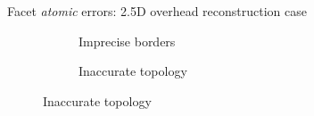 \documentclass[10pt, export]{beamer}
\begin{document}
\begin{frame}{Facet \textit{atomic} errors: 2.5D overhead reconstruction case}
\begin{figure}
\begin{center}
\begin{subfigure}{.33\textwidth}
                        \caption{\label{fig::fac_footprint} Imprecise borders}
                    \end{subfigure}
                    \begin{subfigure}{.33\textwidth}
                        \caption{\label{fig::fac_height} Inaccurate topology}
                    \end{subfigure}
                \end{center}
            \end{figure}
        \end{frame}
\end{document}
